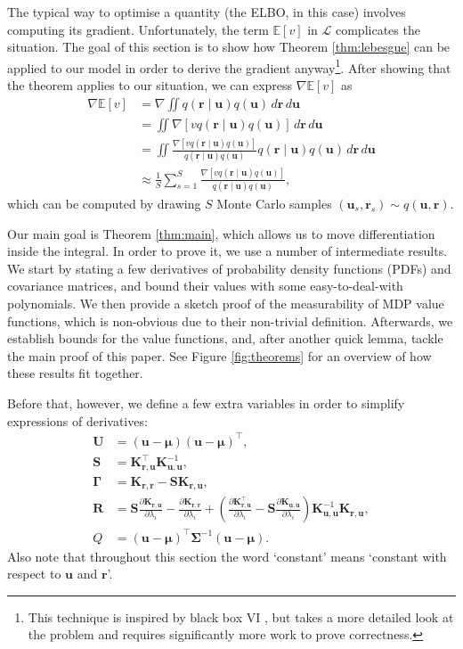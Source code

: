 \documentclass{mpaper}
\newcommand{\dx}{\,d\mathbf{r}\,d\mathbf{u}}
\newcommand{\Kuu}{\mathbf{K}_{\mathbf{u},\mathbf{u}}}
\newcommand{\Krr}{\mathbf{K}_{\mathbf{r},\mathbf{r}}}
\newcommand{\Kru}{\mathbf{K}_{\mathbf{r},\mathbf{u}}}
\newcommand{\approximation}{q(\mathbf{u}, \mathbf{r})}
\begin{document}
The typical way to optimise a quantity (the ELBO, in this case) involves
computing its gradient. Unfortunately, the term $\mathbb{E}[v]$ in $\mathcal{L}$
complicates the situation. The goal of this section is to show how Theorem
\ref{thm:lebesgue} can be applied to our model in order to derive the gradient
anyway\footnote{This technique is inspired by black box VI
  \cite{DBLP:conf/aistats/RanganathGB14}, but takes a more detailed look at the
  problem and requires significantly more work to prove correctness.}. After
showing that the theorem applies to our situation, we can express
$\nabla\mathbb{E}[v]$ as
\begin{align*}
  \nabla\mathbb{E}[v] &= \nabla \iint q(\mathbf{r} \mid \mathbf{u}) q(\mathbf{u})\dx \\
                      &= \iint \nabla[v q(\mathbf{r} \mid \mathbf{u}) q(\mathbf{u})]\dx \\
                      &= \iint \frac{\nabla[v q(\mathbf{r} \mid \mathbf{u})q(\mathbf{u})]}{q(\mathbf{r} \mid \mathbf{u})q(\mathbf{u})} q(\mathbf{r} \mid \mathbf{u}) q(\mathbf{u})\dx \\
                      &\approx \frac{1}{S} \sum_{s=1}^S \frac{\nabla[v q(\mathbf{r} \mid \mathbf{u})q(\mathbf{u})]}{q(\mathbf{r} \mid \mathbf{u})q(\mathbf{u})},
\end{align*}
which can be computed by drawing $S$ Monte Carlo samples $(\mathbf{u}_s,
\mathbf{r}_s) \sim \approximation$.

Our main goal is Theorem \ref{thm:main}, which allows us to move differentiation
inside the integral. In order to prove it, we use a number of intermediate
results. We start by stating a few derivatives of probability density functions
(PDFs) and covariance matrices, and bound their values with some
easy-to-deal-with polynomials. We then provide a sketch proof of the
measurability of MDP value functions, which is non-obvious due to their
non-trivial definition. Afterwards, we establish bounds for the value functions,
and, after another quick lemma, tackle the main proof of this paper. See Figure
\ref{fig:theorems} for an overview of how these results fit together.

Before that, however, we define a few extra variables in order to simplify
expressions of derivatives:
\begin{align*}
  \mathbf{U} &= (\mathbf{u} - \bm\mu)(\mathbf{u} - \bm\mu)^\intercal, \\
  \mathbf{S} &= \Kru^\intercal\Kuu^{-1}, \\
  \bm\Gamma &= \Krr - \mathbf{S}\Kru, \\
  \mathbf{R} &= \mathbf{S}\frac{\partial \Kru}{\partial \lambda_i} - \frac{\partial \Krr}{\partial \lambda_i} + \left( \frac{\partial \Kru^\intercal}{\partial \lambda_i} - \mathbf{S}\frac{\partial \Kuu}{\partial \lambda_i} \right) \Kuu^{-1}\Kru, \\
  Q &= (\mathbf{u} - \bm\mu)^\intercal\bm\Sigma^{-1}(\mathbf{u} - \bm\mu).
\end{align*}
Also note that throughout this section the word `constant' means `constant with
respect to $\mathbf{u}$ and $\mathbf{r}$'.
\end{document}
